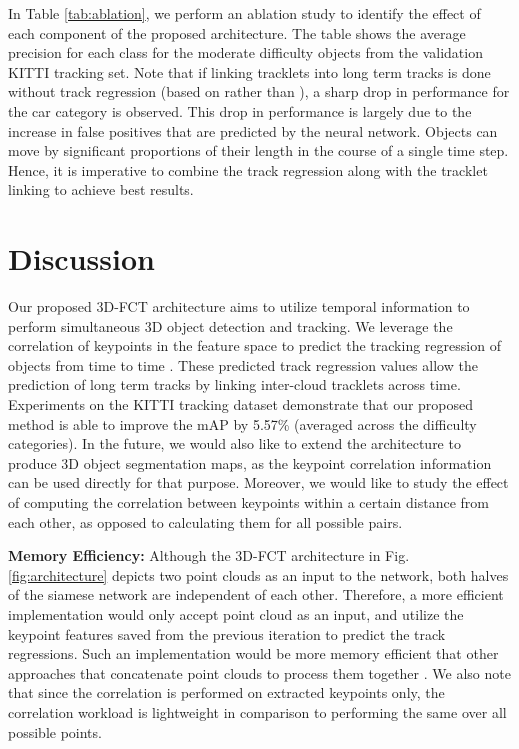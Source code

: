\documentclass[10pt,twocolumn,letterpaper]{article}
\begin{document}
In Table \ref{tab:ablation}, we perform an ablation study to identify the effect of each component of the proposed architecture. The table shows the average precision for each class for the moderate difficulty objects from the validation KITTI tracking set. Note that if linking tracklets into long term tracks is done without track regression (based on  rather than ), a sharp drop in performance for the car category is observed. This drop in performance is largely due to the increase in false positives that are predicted by the neural network. Objects can move by significant proportions of their length in the course of a single time step. Hence, it is imperative to combine the track regression along with the tracklet linking to achieve best results.

\section{Discussion}\label{sec:discussion}
Our proposed 3D-FCT architecture aims to utilize temporal information to perform simultaneous 3D object detection and tracking. We leverage the correlation of keypoints in the feature space to predict the tracking regression of objects from time  to time . These predicted track regression values allow the prediction of long term tracks by linking inter-cloud tracklets across time. Experiments on the KITTI tracking dataset demonstrate that our proposed method is able to improve the mAP by 5.57\% (averaged across the difficulty categories). In the future, we would also like to extend the architecture to produce 3D object segmentation maps, as the keypoint correlation information can be used directly for that purpose. Moreover, we would like to study the effect of computing the correlation between keypoints within a certain distance from each other, as opposed to calculating them for all possible pairs.

\textbf{Memory Efficiency:} Although the 3D-FCT architecture in Fig. \ref{fig:architecture} depicts two point clouds as an input to the network, both halves of the siamese network are independent of each other. Therefore, a more efficient implementation would only accept point cloud  as an input, and utilize the keypoint features  saved from the previous iteration to predict the track regressions. Such an implementation would be more memory efficient that other approaches that concatenate point clouds to process them together \cite{Lang_2019_CVPR,Luo2018}. We also note that since the correlation is performed on extracted keypoints only, the correlation workload is lightweight in comparison to performing the same over all possible points.
\end{document}
